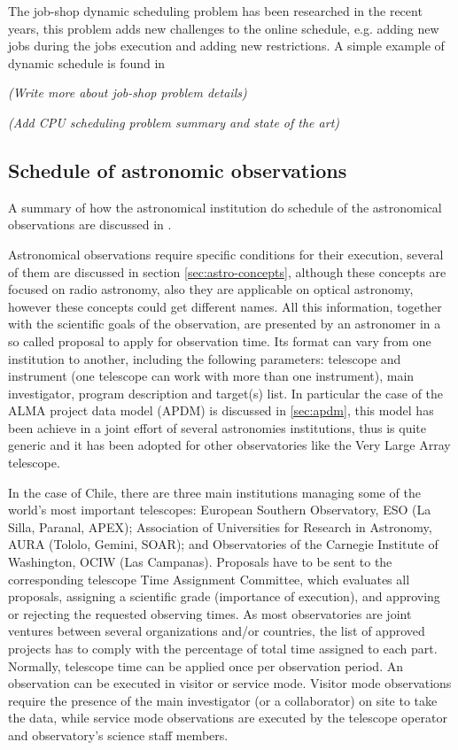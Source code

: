 \documentclass[11pt]{article}
\begin{document}
The job-shop dynamic scheduling problem has been researched in the recent years, this problem adds new challenges to the online schedule, e.g. adding new jobs during the jobs execution and adding new restrictions. A simple example of dynamic schedule is found in 

\textit{(Write more about job-shop problem details)}

\textit{(Add CPU scheduling problem summary and state of the art)}

\subsection{Schedule of astronomic observations}

A summary of how the astronomical institution do schedule of the astronomical observations are discussed in \cite{mora11}.

Astronomical observations require specific conditions for their execution, several of them are discussed in section \ref{sec:astro-concepts}, although these concepts are focused on radio astronomy, also they are applicable on optical astronomy, however these concepts could get different names. All this information, together with the scientific goals of the observation, are presented by an astronomer in a so called proposal to apply for observation time. Its format can vary from one institution to another, including the following parameters: telescope and instrument (one telescope can work with more than one instrument), main investigator, program description and target(s) list. In particular the case of the ALMA project data model (APDM) is discussed in \ref{sec:apdm}, this model has been achieve in a joint effort of several astronomies institutions, thus is quite generic and it has been adopted for other observatories like the Very Large Array telescope.

In the case of Chile, there are three main institutions managing some of the world’s most important telescopes: European Southern Observatory, ESO (La Silla, Paranal, APEX); Association of Universities for Research in Astronomy, AURA (Tololo, Gemini, SOAR); and Observatories of the Carnegie Institute of Washington, OCIW (Las Campanas). Proposals have to be sent to the corresponding telescope Time Assignment Committee, which evaluates all proposals, assigning a scientific grade (importance of execution), and approving or rejecting the requested observing times. As most observatories are joint ventures between several organizations and/or countries, the list of approved projects has to comply with the percentage of total time assigned to each part. Normally, telescope time can be applied once per observation period. An observation can be executed in visitor or service mode. Visitor mode observations require the presence of the main investigator (or a collaborator) on site to take the data, while service mode observations are executed by the telescope operator and observatory’s science staff members.
\end{document}
